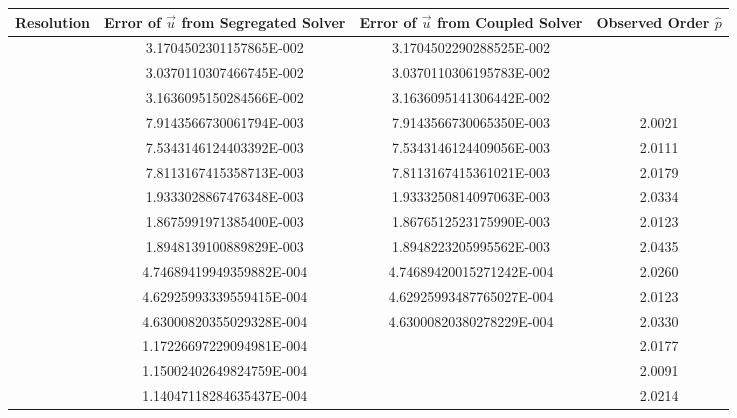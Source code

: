\begin{table}[h!]\centering
{}
  \begin{tabular}{cccc}\toprule
    Resolution & Error of \(\vec{u}\) from Segregated Solver & Error of \(\vec{u}\) from Coupled Solver & Observed Order \(\hat{p}\) \\
    \midrule
    \rowcolor{black!20}\multirow{3}{*}{}          & 3.1704502301157865E-002 & 3.1704502290288525E-002 &  \\
    \rowcolor{black!20}                           & 3.0370110307466745E-002 & 3.0370110306195783E-002 &  \\
    \rowcolor{black!20} \multirow{-3}{*}{8x8x8}   & 3.1636095150284566E-002 & 3.1636095141306442E-002 &  \\ %
    \rowcolor{black!00}\multirow{3}{*}{}          & 7.9143566730061794E-003 &  7.9143566730065350E-003 & 2.0021  \\
    \rowcolor{black!00}                           & 7.5343146124403392E-003 &  7.5343146124409056E-003 & 2.0111  \\
    \rowcolor{black!00} \multirow{-3}{*}{16x16x16}& 7.8113167415358713E-003 &  7.8113167415361021E-003 & 2.0179  \\ %
    \rowcolor{black!20}\multirow{3}{*}{}          & 1.9333028867476348E-003  & 1.9333250814097063E-003 & 2.0334  \\
    \rowcolor{black!20}                           & 1.8675991971385400E-003  & 1.8676512523175990E-003 & 2.0123  \\
    \rowcolor{black!20} \multirow{-3}{*}{32x32x32}&  1.8948139100889829E-003 & 1.8948223205995562E-003 & 2.0435  \\ %
    \rowcolor{black!00}\multirow{3}{*}{}          & 4.74689419949359882E-004 & 4.74689420015271242E-004 & 2.0260 \\
    \rowcolor{black!00}                           & 4.62925993339559415E-004 & 4.62925993487765027E-004 & 2.0123 \\
    \rowcolor{black!00} \multirow{-3}{*}{64x64x64}& 4.63000820355029328E-004 & 4.63000820380278229E-004 & 2.0330 \\ %
    \rowcolor{black!20}\multirow{3}{*}{}             & 1.17226697229094981E-004 & & 2.0177  \\
    \rowcolor{black!20}                              & 1.15002402649824759E-004 & & 2.0091  \\
    \rowcolor{black!20} \multirow{-3}{*}{128x128x128}& 1.14047118284635437E-004 & & 2.0214  \\ %

\end{tabular}
\end{table}
